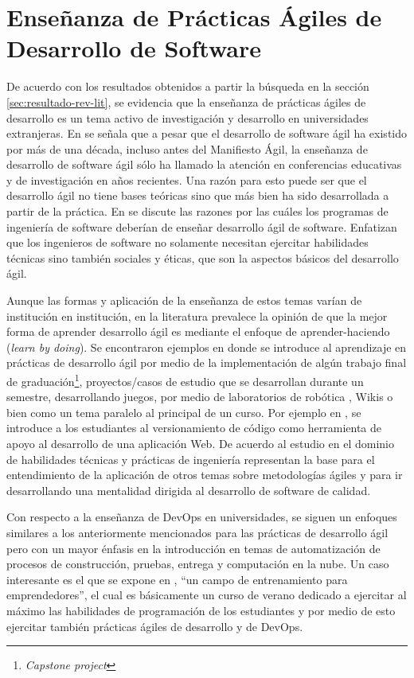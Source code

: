 \documentclass[journal]{IEEEtran}
\begin{document}
\section{Enseñanza de Prácticas Ágiles de Desarrollo de Software} \label{sec:ensenanza}
De acuerdo con los resultados obtenidos a partir la búsqueda en la sección \ref{sec:resultado-rev-lit}, se evidencia que la enseñanza de prácticas ágiles de desarrollo es un tema activo de investigación y desarrollo en universidades extranjeras. En \cite{kropp-meier-1} se señala que a pesar que el desarrollo de software ágil ha existido por más de una década, incluso antes del Manifiesto Ágil, la enseñanza de desarrollo de software ágil sólo ha llamado la atención en conferencias educativas y de investigación en años recientes. Una razón para esto puede ser que el desarrollo ágil no tiene bases teóricas sino que más bien ha sido desarrollada a partir de la práctica. En \cite{hazzan-dubinsky} se discute las razones por las cuáles los programas de ingeniería de software deberían de enseñar desarrollo ágil de software. Enfatizan que los ingenieros de software no solamente necesitan ejercitar habilidades técnicas sino también sociales y éticas, que son la aspectos básicos del desarrollo ágil.


Aunque las formas y aplicación de la enseñanza de estos temas varían de institución en institución, en la literatura prevalece la opinión de que la mejor forma de aprender desarrollo ágil es mediante el enfoque de aprender-haciendo (\emph{learn by doing}). Se encontraron ejemplos en donde se introduce al aprendizaje en prácticas de desarrollo ágil por medio de la implementación de algún trabajo final de graduación\footnote{\emph{Capstone project}}\cite{ding-yousef-yue}, proyectos/casos de estudio que se desarrollan durante un semestre\cite{steghoger-et-al}, desarrollando juegos\cite{scharlau}, por medio de laboratorios de robótica \cite{schroeder-et-al}, Wikis \cite{cubric} o bien como un tema paralelo al principal de un curso. Por ejemplo en \cite{haaranen-lehtinen}, se introduce a los estudiantes al versionamiento de código como herramienta de apoyo al desarrollo de una aplicación Web. De acuerdo al estudio en \cite{kropp-meier-2} el dominio de habilidades técnicas y prácticas de ingeniería representan la base para el entendimiento de la aplicación de otros temas sobre metodologías ágiles y para ir desarrollando una mentalidad dirigida al desarrollo de software de calidad.

Con respecto a la enseñanza de DevOps en universidades, se siguen un enfoques similares a los anteriormente mencionados para las prácticas de desarrollo ágil pero con un mayor énfasis en la introducción en temas de automatización \cite{henrik-b, bang-et-al, betz-et-al} de procesos de construcción, pruebas, entrega y computación en la nube. Un caso interesante es el que se expone en \cite{hickey-salas}, ``un campo de entrenamiento para emprendedores'', el cual es básicamente un curso de verano dedicado a ejercitar al máximo las habilidades de programación de los estudiantes y por medio de esto ejercitar también prácticas ágiles de desarrollo y de DevOps.
\end{document}
